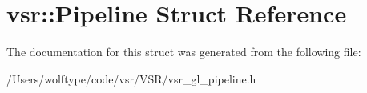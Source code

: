 \hypertarget{structvsr_1_1_pipeline}{\section{vsr\-:\-:Pipeline Struct Reference}
\label{structvsr_1_1_pipeline}
}


The documentation for this struct was generated from the following file\-:\begin{DoxyCompactItemize}
\item 
/\-Users/wolftype/code/vsr/\-V\-S\-R/vsr\-\_\-gl\-\_\-pipeline.\-h\end{DoxyCompactItemize}
